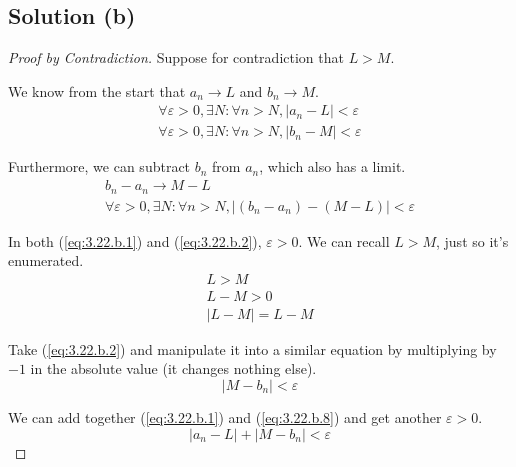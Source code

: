 \documentclass[12pt]{report}
\begin{document}
    \subsection{Solution (b)}
        \begin{proof}[Proof by Contradiction]
            Suppose for contradiction that $L > M$.

            We know from the start that $a_n \to L$ and $b_n \to M$.
            \begin{gather}
                \label{eq:3.22.b.1}
                \forall \varepsilon > 0, \exists N : \forall n > N, \left| a_n - L \right| < \varepsilon\\
                \label{eq:3.22.b.2}
                \forall \varepsilon > 0, \exists N : \forall n > N, \left| b_n - M \right| < \varepsilon
            \end{gather}

            Furthermore, we can subtract $b_n$ from $a_n$, which also has a limit.
            \begin{gather}
                \label{eq:3.22.b.3}
                b_n - a_n \to M - L\\
                \label{eq:3.22.b.4}
                \forall \varepsilon > 0, \exists N : \forall n > N, \left| (b_n - a_n) - (M - L) \right| < \varepsilon
            \end{gather}

            In both (\ref{eq:3.22.b.1}) and (\ref{eq:3.22.b.2}), $\varepsilon > 0$.
            We can recall $L > M$, just so it's enumerated.
            \begin{gather}
                \label{eq:3.22.b.5}
                L > M\\
                \label{eq:3.22.b.6}
                L - M > 0\\
                \label{eq:3.22.b.7}
                \left| L - M \right| = L - M
            \end{gather}

            Take (\ref{eq:3.22.b.2}) and manipulate it into a similar equation by multiplying by $-1$ in the absolute value (it changes nothing else).
            \begin{equation}
                \label{eq:3.22.b.8}
                \left| M - b_n \right| < \varepsilon
            \end{equation}

            We can add together (\ref{eq:3.22.b.1}) and (\ref{eq:3.22.b.8}) and get another $\varepsilon > 0$.
            \begin{equation}
                \label{eq:3.22.b.9}
                \left| a_n - L \right| + \left| M - b_n \right| < \varepsilon
            \end{equation}


\end{proof}
\end{document}
